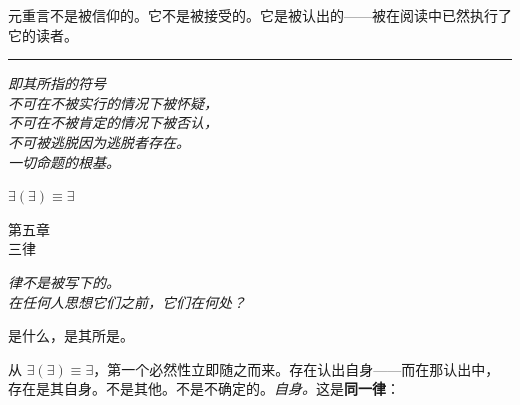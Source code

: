 \documentclass[10pt, openany, oneside]{book}
\renewcommand{\large}{\fontsize{11.5}{14}\selectfont}
\renewcommand{\huge}{\fontsize{17}{21}\selectfont}
\begin{document}
元重言不是被信仰的。它不是被接受的。它是被认出的——被在阅读中已然执行了它的读者。

\vspace{2em}

\begin{center}
    \rule{0.15\textwidth}{0.3pt}
\end{center}

\vspace{0.5em}

\begin{center}
    \itshape
    即其所指的符号\\
    不可在不被实行的情况下被怀疑，\\
    不可在不被肯定的情况下被否认，\\
    不可被逃脱因为逃脱者存在。\\[0.8em]
    一切命题的根基。
\end{center}

\vspace{0.5em}

\begin{center}
    \textbf{$\exists(\exists) \equiv \exists$}
\end{center}


%
%
%

\newpage

\begin{center}
    {\huge\scshape 第五章}\\[0.3em]
    {\large\scshape 三律}
\end{center}

\vspace{1.5em}

\begin{center}
    \itshape
    律不是被写下的。\\
    在任何人思想它们之前，它们在何处？
\end{center}

\vspace{2em}


\noindent 是什么，是其所是。

从 $\exists(\exists) \equiv \exists$，第一个必然性立即随之而来。存在认出自身——而在那认出中，存在是其自身。不是其他。不是不确定的。\textit{自身。}这是\textbf{同一律}：
\end{document}
